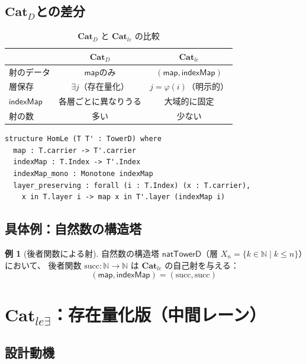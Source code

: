 \documentclass[a4paper,11pt]{ltjsarticle}
\theoremstyle{definition}
\newtheorem{example}[definition]{例}
\theoremstyle{plain}
\newcommand{\CatD}{\mathbf{Cat}_D}
\newcommand{\Catle}{\mathbf{Cat}_{le}}
\newcommand{\CatleE}{\mathbf{Cat}_{le\exists}}
\newcommand{\indexMap}{\mathsf{indexMap}}
\begin{document}
\subsection{$\CatD$との差分}

\begin{table}[htbp]
\centering
\caption{$\CatD$ と $\Catle$ の比較}
\begin{tabular}{lcc}
\toprule
 & $\CatD$ & $\Catle$ \\
\midrule
射のデータ & $\mathsf{map}$のみ & $(\mathsf{map}, \indexMap)$ \\
層保存 & $\exists j$（存在量化） & $j = \varphi(i)$（明示的） \\
$\indexMap$ & 各層ごとに異なりうる & 大域的に固定 \\
射の数 & 多い & 少ない \\
\bottomrule
\end{tabular}
\end{table}

\begin{leancode}
\begin{lstlisting}
structure HomLe (T T' : TowerD) where
  map : T.carrier -> T'.carrier
  indexMap : T.Index -> T'.Index
  indexMap_mono : Monotone indexMap
  layer_preserving : forall (i : T.Index) (x : T.carrier),
    x in T.layer i -> map x in T'.layer (indexMap i)
\end{lstlisting}
\end{leancode}

\subsection{具体例：自然数の構造塔}

\begin{example}[後者関数による射]
自然数の構造塔 $\mathsf{natTowerD}$（層 $X_n = \{k \in \mathbb{N} \mid k \leq n\}$）において、
後者関数 $\mathrm{succ} : \mathbb{N} \to \mathbb{N}$ は $\Catle$ の自己射を与える：
\[
  (\mathsf{map}, \indexMap) = (\mathrm{succ}, \mathrm{succ})
\]
\end{example}

\section{$\CatleE$：存在量化版（中間レーン）}
\label{sec:cat-le-exists}

\subsection{設計動機}
\end{document}
